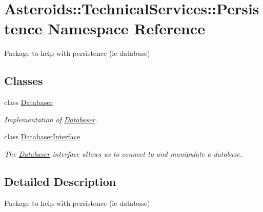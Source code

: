 \hypertarget{namespaceAsteroids_1_1TechnicalServices_1_1Persistence}{}\section{Asteroids\+:\+:Technical\+Services\+:\+:Persistence Namespace Reference}
\label{namespaceAsteroids_1_1TechnicalServices_1_1Persistence}


Package to help with persistence (ie database)  


\subsection*{Classes}
\begin{DoxyCompactItemize}
\item 
class \hyperlink{classAsteroids_1_1TechnicalServices_1_1Persistence_1_1Databaser}{Databaser}
\begin{DoxyCompactList}\small\item\em Implementation of \hyperlink{classAsteroids_1_1TechnicalServices_1_1Persistence_1_1Databaser}{Databaser}. \end{DoxyCompactList}\item 
class \hyperlink{classAsteroids_1_1TechnicalServices_1_1Persistence_1_1DatabaserInterface}{Databaser\+Interface}
\begin{DoxyCompactList}\small\item\em The \hyperlink{classAsteroids_1_1TechnicalServices_1_1Persistence_1_1Databaser}{Databaser} interface allows us to connect to and manipulate a database. \end{DoxyCompactList}\end{DoxyCompactItemize}


\subsection{Detailed Description}
Package to help with persistence (ie database) 